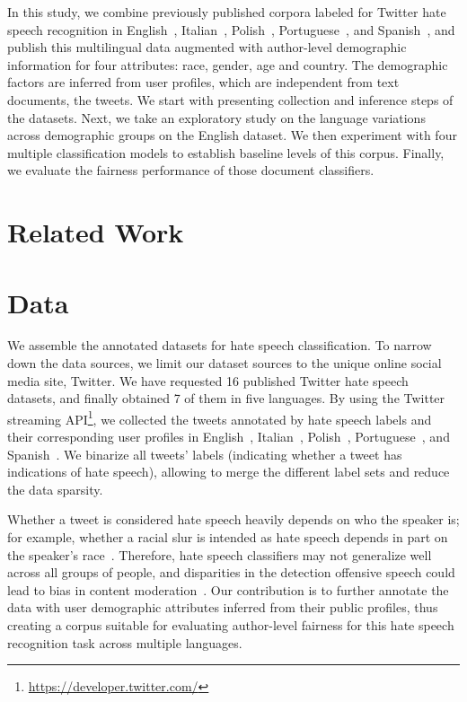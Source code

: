 In this study, we combine previously published corpora labeled for Twitter hate speech recognition in English~\cite{waseem2016hateful,waseem2016you,founta2018large}, Italian~\cite{sanguinetti2018italian}, Polish~\cite{ptaszynski2017learning}, Portuguese~\cite{fortuna2019hierarchically}, and Spanish~\cite{basile2019semeval}, and publish this multilingual data augmented with author-level demographic information for four attributes: race, gender, age and country.
The demographic factors are inferred from user profiles, which are independent from text documents, the tweets.
We start with presenting collection and inference steps of the datasets.
Next, we take an exploratory study on the language variations across demographic groups on the English dataset.
We then experiment with four multiple classification models to establish baseline levels of this corpus.
Finally, we evaluate the fairness performance of those document classifiers.


\section{Related Work}



\section{Data}
\label{chp5:sec:data}

We assemble the annotated datasets for hate speech classification.
To narrow down the data sources, we limit our dataset sources to the unique online social media site, Twitter.
We have requested 16 published Twitter hate speech datasets, and finally obtained 7 of them in five languages.
By using the Twitter streaming API\footnote{\url{https://developer.twitter.com/}}, we collected the tweets annotated by hate speech labels and their corresponding user profiles in English~\cite{waseem2016hateful,waseem2016you,founta2018large}, Italian~\cite{sanguinetti2018italian}, Polish~\cite{ptaszynski2017learning}, Portuguese~\cite{fortuna2019hierarchically}, and Spanish~\cite{basile2019semeval}.
We binarize all tweets' labels (indicating whether a tweet has indications of hate speech), allowing to merge the different label sets and reduce the data sparsity.

Whether a tweet is considered hate speech heavily depends on who the speaker is; for example, whether a racial slur is intended as hate speech depends in part on the speaker's race~\cite{waseem2016hateful}.
Therefore, hate speech classifiers may not generalize well across all groups of people, and disparities in the detection offensive speech could lead to bias in content moderation~\cite{ICWSM1817809}.
Our contribution is to further annotate the data with user demographic attributes inferred from their public profiles,
thus creating a corpus suitable for evaluating author-level fairness for this hate speech recognition task across multiple languages.

